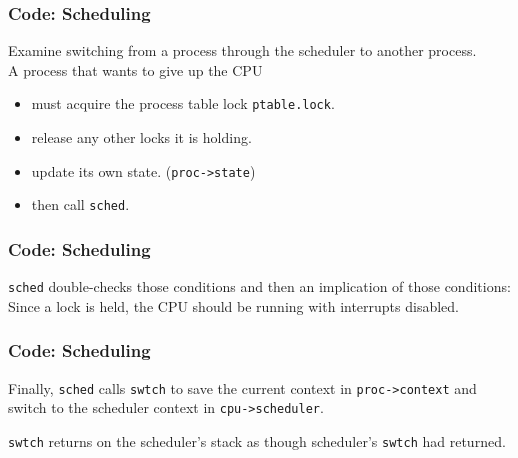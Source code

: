 \documentclass{beamer}
\begin{document}
\begin{frame}[t]
  \frametitle{Code: Scheduling}

  Examine switching from a process through the scheduler to another process.\\
  A process that wants to give up the CPU
  \begin{itemize}
  \item must acquire the process table lock \texttt{ptable.lock}.
  \item release any other locks it is holding.
  \item update its own state. (\texttt{proc->state})
  \item then call \texttt{sched}.
  \end{itemize}

\end{frame}


\begin{frame}[t]
  \frametitle{Code: Scheduling}
  \texttt{sched} double-checks those conditions and then an implication of those conditions:\\
  Since a lock is held, the CPU should be running with interrupts disabled.

  \begin{figure}
    
  \end{figure}

  
\end{frame}


\begin{frame}[t]
  \frametitle{Code: Scheduling}
  Finally, \texttt{sched} calls \texttt{swtch} to save the current context in
  \texttt{proc->context} and switch to the scheduler context in \texttt{cpu->scheduler}.

  \begin{figure}
    
  \end{figure}

  \texttt{swtch} returns on the scheduler’s stack as though scheduler’s \texttt{swtch} had returned.
  
\end{frame}
\end{document}
